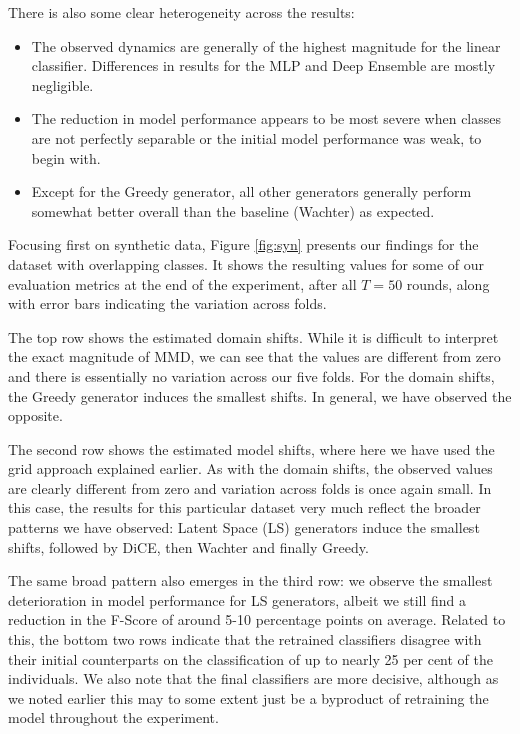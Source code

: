 \documentclass[conference,final,]{IEEEtran}
\providecommand{\tightlist}{%
  \setlength{\itemsep}{0pt}\setlength{\parskip}{0pt}}
\theoremstyle{definition}
\theoremstyle{definition}
\theoremstyle{definition}
\theoremstyle{definition}
\theoremstyle{remark}
\begin{document}
There is also some clear heterogeneity across the results:

\begin{itemize}
\tightlist
\item
  The observed dynamics are generally of the highest magnitude for the linear classifier. Differences in results for the MLP and Deep Ensemble are mostly negligible.
\item
  The reduction in model performance appears to be most severe when classes are not perfectly separable or the initial model performance was weak, to begin with.
\item
  Except for the Greedy generator, all other generators generally perform somewhat better overall than the baseline (Wachter) as expected.
\end{itemize}

Focusing first on synthetic data, Figure \ref{fig:syn} presents our findings for the dataset with overlapping classes. It shows the resulting values for some of our evaluation metrics at the end of the experiment, after all \(T=50\) rounds, along with error bars indicating the variation across folds.

The top row shows the estimated domain shifts. While it is difficult to interpret the exact magnitude of MMD, we can see that the values are different from zero and there is essentially no variation across our five folds. For the domain shifts, the Greedy generator induces the smallest shifts. In general, we have observed the opposite.

The second row shows the estimated model shifts, where here we have used the grid approach explained earlier. As with the domain shifts, the observed values are clearly different from zero and variation across folds is once again small. In this case, the results for this particular dataset very much reflect the broader patterns we have observed: Latent Space (LS) generators induce the smallest shifts, followed by DiCE, then Wachter and finally Greedy.

The same broad pattern also emerges in the third row: we observe the smallest deterioration in model performance for LS generators, albeit we still find a reduction in the F-Score of around 5-10 percentage points on average. Related to this, the bottom two rows indicate that the retrained classifiers disagree with their initial counterparts on the classification of up to nearly 25 per cent of the individuals. We also note that the final classifiers are more decisive, although as we noted earlier this may to some extent just be a byproduct of retraining the model throughout the experiment.
\end{document}
